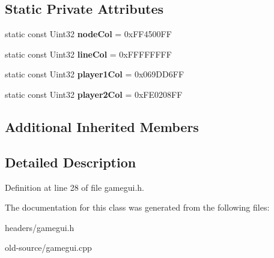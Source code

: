 \subsection*{Static Private Attributes}
\begin{DoxyCompactItemize}
\item 
\hypertarget{classGameGUI_a3538fd5d42ac59248b1a83d5f43fad0c}{static const Uint32 {\bfseries node\+Col} = 0x\+F\+F4500\+F\+F}\label{classGameGUI_a3538fd5d42ac59248b1a83d5f43fad0c}

\item 
\hypertarget{classGameGUI_ab0bebe6620cd6172be5897a42a0dcacb}{static const Uint32 {\bfseries line\+Col} = 0x\+F\+F\+F\+F\+F\+F\+F\+F}\label{classGameGUI_ab0bebe6620cd6172be5897a42a0dcacb}

\item 
\hypertarget{classGameGUI_af35f33e73362109de3751e0478c36cee}{static const Uint32 {\bfseries player1\+Col} = 0x069\+D\+D6\+F\+F}\label{classGameGUI_af35f33e73362109de3751e0478c36cee}

\item 
\hypertarget{classGameGUI_aca95044a11eb45ba6aee9c6842a4afb4}{static const Uint32 {\bfseries player2\+Col} = 0x\+F\+E0208\+F\+F}\label{classGameGUI_aca95044a11eb45ba6aee9c6842a4afb4}

\end{DoxyCompactItemize}
\subsection*{Additional Inherited Members}


\subsection{Detailed Description}


Definition at line 28 of file gamegui.\+h.



The documentation for this class was generated from the following files\+:\begin{DoxyCompactItemize}
\item 
headers/gamegui.\+h\item 
old-\/source/gamegui.\+cpp\end{DoxyCompactItemize}
